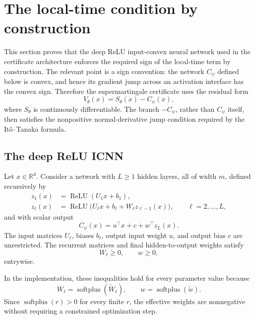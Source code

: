 \section{The local-time condition by construction}
\label{sec:local-time-by-construction}

This section proves that the deep ReLU input-convex neural network used in the
certificate architecture enforces the required sign of the local-time term by
construction.  The relevant point is a sign convention: the network
\(C_\psi\) defined below is convex, and hence its gradient jump across an
activation interface has the convex sign.  Therefore the supermartingale
certificate uses the residual form
\[
    V_\theta(x)=S_\theta(x)-C_\psi(x),
\]
where \(S_\theta\) is continuously differentiable.  The branch
\(-C_\psi\), rather than \(C_\psi\) itself, then satisfies the nonpositive
normal-derivative jump condition required by the It\^o--Tanaka formula.

\subsection{The deep ReLU ICNN}

Let \(x\in\mathbb R^d\).  Consider a network with \(L\geq 1\) hidden layers,
all of width \(m\), defined recursively by
\begin{align}
    z_1(x)
    &=
    \operatorname{ReLU}(U_1x+b_1),
    \\
    z_{\ell}(x)
    &=
    \operatorname{ReLU}
    \bigl(U_{\ell}x+b_{\ell}+W_{\ell}z_{\ell-1}(x)\bigr),
    \qquad \ell=2,\dots,L,
\end{align}
and with scalar output
\begin{equation}
    C_\psi(x)
    =
    u^\top x+c+w^\top z_L(x).
    \label{eq:deep-relu-icnn}
\end{equation}
The input matrices \(U_\ell\), biases \(b_\ell\), output input weight \(u\),
and output bias \(c\) are unrestricted.  The recurrent matrices and final
hidden-to-output weights satisfy
\begin{equation}
    W_\ell\geq 0,
    \qquad
    w\geq 0,
    \label{eq:icnn-nonnegative-weights}
\end{equation}
entrywise.

In the implementation, these inequalities hold for every parameter value
because
\[
    W_\ell=\operatorname{softplus}(\widetilde W_\ell),
    \qquad
    w=\operatorname{softplus}(\widetilde w).
\]
Since \(\operatorname{softplus}(r)>0\) for every finite \(r\), the effective
weights are nonnegative without requiring a constrained optimization step.

